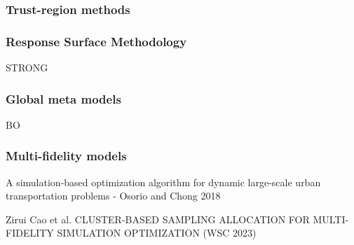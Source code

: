 \documentclass{article}
\begin{document}
\subsubsection{Trust-region methods}

\subsubsection{Response Surface Methodology}

STRONG

\subsubsection{Global meta models}

BO

\subsubsection{Multi-fidelity models}

A simulation-based optimization algorithm for dynamic large-scale urban transportation problems - Osorio and Chong 2018 \newline

Zirui Cao et al. CLUSTER-BASED SAMPLING ALLOCATION FOR MULTI-FIDELITY SIMULATION OPTIMIZATION (WSC 2023)
\end{document}
